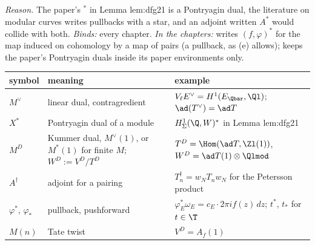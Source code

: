 \noindent\emph{Reason.} The paper's ${}^*$ in Lemma lem:dfg21 is a Pontryagin dual, the literature on modular curves writes
pullbacks with a star, and an adjoint written $A^*$ would collide with both. \emph{Binds:} every chapter. \emph{In the chapters:}
 writes $(f,\varphi)^*$ for the map induced on cohomology by a map of pairs (a pullback, as (e) allows);
 keeps the paper's Pontryagin duals inside its paper environments only.

\begin{center}\small
\begin{tabular}{@{}p{2.2cm}p{5.6cm}p{6.6cm}@{}}
\toprule
symbol & meaning & example\\
\midrule
$M^\vee$ & linear dual, contragredient & $V_\ell E^\vee=H^1(E_{\Qbar},\Ql)$; $\ad(T^\vee)=\ad T$\\
$X^*$ & Pontryagin dual of a module & $H^1_\Sigma(\Q,W)^*$ in Lemma lem:dfg21\\
$M^D$ & Kummer dual, $M^\vee(1)$, or $M^*(1)$ for finite $M$; $W^D:=V^D/T^D$ & $T^D=\Hom(\ad T,\Zl(1))$, $W^D=\ad T(1)\otimes\Qlmod$\\
$A^\dagger$ & adjoint for a pairing & $T_n^\dagger=w_NT_nw_N$ for the Petersson product\\
$\varphi^*$, $\varphi_*$ & pullback, pushforward & $\varphi_E^*\omega_E=c_E\cdot2\pi if(z)\,dz$; $t^*$, $t_*$ for $t\in\T$\\
$M(n)$ & Tate twist & $V^D=A_f(1)$\\
\bottomrule
\end{tabular}
\end{center}


